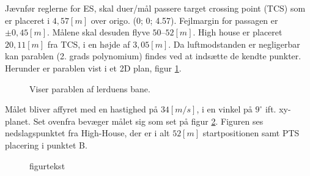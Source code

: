 Jævnfør reglerne for ES, skal duer/mål passere target crossing point (TCS) som er 
placeret i $4,57 [m]$ over origo. (0; 0; 4.57). Fejlmargin for passagen er $\pm0,45 [m]$. 
Målene skal desuden flyve $50 – 52 [m]$.  High house er placeret $20,11 [m]$ fra TCS, i en 
højde af $3,05 [m]$. Da luftmodstanden er negligerbar kan parablen (2. grads 
polynomium) findes ved at indsætte de kendte punkter. Herunder er parablen vist i et 
2D plan, figur \ref{fig:HH2D_para}.
\begin{figure}[!th]
\centering
\begin{tikzpicture}[scale=1]

\end{tikzpicture}
\caption[Lerdue parabel]{Viser parablen af lerduens bane.}
\label{fig:HH2D_para}
\end{figure}




Målet bliver affyret med en hastighed på $34 [m/s]$, i en vinkel på $9^{\circ}$ ift. xy-
planet. Set ovenfra bevæger målet sig som set på figur \ref{fig:para_in_xy_plane}. 
Figuren ses nedslagspunktet fra High-House, der er i alt $52 [m]$ startpositionen samt 
PTS placering i punktet B. 



\begin{figure}[!th]
\centering
\begin{tikzpicture}[scale=0.2]

\end{tikzpicture}
\caption[tekst i indholdsfortegnelsen]{figurtekst}
\label{fig:para_in_xy_plane}
\end{figure}

